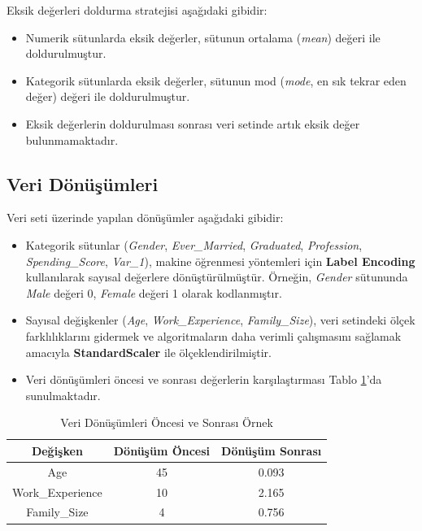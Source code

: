 \documentclass{article}
\begin{document}
Eksik değerleri doldurma stratejisi aşağıdaki gibidir:
\begin{itemize}
    \item Numerik sütunlarda eksik değerler, sütunun ortalama (\textit{mean}) değeri ile doldurulmuştur.
    \item Kategorik sütunlarda eksik değerler, sütunun mod (\textit{mode}, en sık tekrar eden değer) değeri ile doldurulmuştur.
    \item Eksik değerlerin doldurulması sonrası veri setinde artık eksik değer bulunmamaktadır.
\end{itemize}

\subsection{Veri Dönüşümleri}

Veri seti üzerinde yapılan dönüşümler aşağıdaki gibidir:
\begin{itemize}
    \item Kategorik sütunlar (\textit{Gender}, \textit{Ever\_Married}, \textit{Graduated}, \textit{Profession}, \textit{Spending\_Score}, \textit{Var\_1}), makine öğrenmesi yöntemleri için \textbf{Label Encoding} kullanılarak sayısal değerlere dönüştürülmüştür. Örneğin, \textit{Gender} sütununda \textit{Male} değeri 0, \textit{Female} değeri 1 olarak kodlanmıştır.
    \item Sayısal değişkenler (\textit{Age}, \textit{Work\_Experience}, \textit{Family\_Size}), veri setindeki ölçek farklılıklarını gidermek ve algoritmaların daha verimli çalışmasını sağlamak amacıyla \textbf{StandardScaler} ile ölçeklendirilmiştir.
    \item Veri dönüşümleri öncesi ve sonrası değerlerin karşılaştırması Tablo \ref{tab:data_transformation_example}’da sunulmaktadır.
\end{itemize}

\begin{table}[H]
    \centering
    \caption{Veri Dönüşümleri Öncesi ve Sonrası Örnek}
    \label{tab:data_transformation_example}
    \begin{tabular}{|c|c|c|}
        \hline
        \textbf{Değişken} & \textbf{Dönüşüm Öncesi} & \textbf{Dönüşüm Sonrası} \\
        \hline
        Age & 45 & 0.093 \\
        Work\_Experience & 10 & 2.165 \\
        Family\_Size & 4 & 0.756 \\
        \hline
    \end{tabular}
\end{table}
\end{document}
